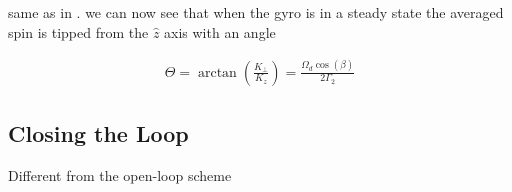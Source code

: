 \documentclass{article}
\begin{document}
same as in \cite{walker2016spin}. we can now see that when the gyro is in a steady state the averaged spin is tipped from the $\hat{z}$ axis with an angle

\begin{align}
    \Theta = \arctan\left(\frac{K_{\perp}}{K_z}\right)=\frac{\Omega_d \cos{\left(\beta\right)}}{2\Gamma_2}
\end{align}

\subsection{Closing the Loop}
Different from the open-loop scheme 




\end{document}
